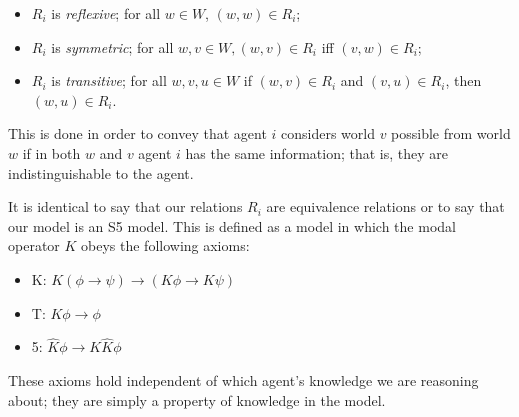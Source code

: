 \documentclass[10pt, a4paper]{report}
\begin{document}
\begin{itemize}
\item $R_i$ is \emph{reflexive}; for all $w \in W$, $(w, w) \in R_i$;
\item $R_i$ is \emph{symmetric}; for all $w, v \in W, (w, v) \in R_i$ iff $(v,
  w) \in R_i$;
\item $R_i$ is \emph{transitive}; for all $w, v, u \in W$ if $(w, v) \in R_i$
  and $(v, u) \in R_i$, then $(w, u) \in R_i$.
\end{itemize}

This is done in order to convey that agent $i$ considers world $v$ possible from
world $w$ if in both $w$ and $v$ agent $i$ has the same information; that is,
they are indistinguishable to the agent.

It is identical to say that our relations $R_i$ are equivalence relations or to
say that our model is an \textsf{S5} model. This is defined as a model in which
the modal operator $K$ obeys the following axioms:

\begin{itemize}
\item \textsf{K}: $K (\phi \rightarrow \psi) \rightarrow (K \phi \rightarrow K
  \psi)$
\item \textsf{T}: $K \phi \rightarrow \phi$
\item \textsf{5}: $\widehat K \phi \rightarrow K \widehat K \phi$
\end{itemize}

These axioms hold independent of which agent's knowledge we are reasoning about;
they are simply a property of knowledge in the model. 

\begin{figure}[h]
  \centering
  \caption{}
  \label{fig:EgS5}
\end{figure}
\end{document}
